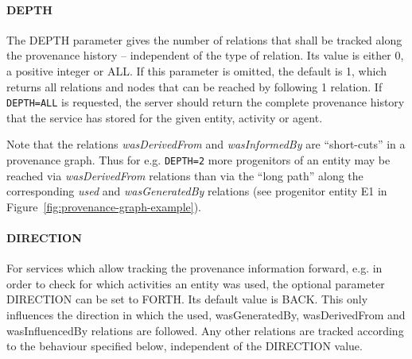 
\paragraph{{DEPTH}}
The DEPTH parameter gives the number of relations that shall be tracked along
the provenance history -- independent of the type of relation. Its value is
either 0, a positive integer or ALL. If this parameter is omitted,
the default is 1, which returns all relations and nodes that can be reached
by following 1 relation. If \texttt{DEPTH=ALL} is requested, the server should
return the complete provenance history that the service has stored for the
given entity, activity or agent. 


Note that the relations \emph{wasDerivedFrom} and \emph{wasInformedBy} are ``short-cuts''
in a provenance graph. Thus for e.g. \texttt{DEPTH=2} more progenitors of an entity may
be reached via \emph{wasDerivedFrom} relations than via the ``long path'' along the
corresponding \emph{used} and \emph{wasGeneratedBy} relations (see progenitor entity E1 in
Figure~\ref{fig:provenance-graph-example}).



\paragraph{DIRECTION}
For services which allow tracking the provenance information forward, e.g. in order to check for which activities an entity was used, the optional parameter DIRECTION can be set to FORTH. Its default value is BACK. This only influences the direction in which the used, wasGeneratedBy, wasDerivedFrom and wasInfluencedBy relations are followed. Any other relations are tracked according to the behaviour specified below, independent of the DIRECTION value.

